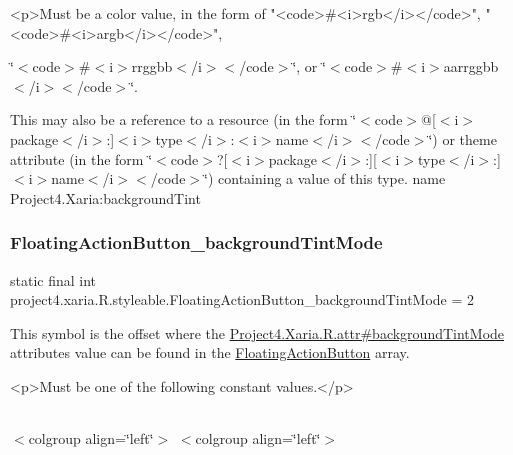 \begin{DoxyVerb}      <p>Must be a color value, in the form of "<code>#<i>rgb</i></code>", "<code>#<i>argb</i></code>",
\end{DoxyVerb}
 \char`\"{}$<$code$>$\#$<$i$>$rrggbb$<$/i$>$$<$/code$>$\char`\"{}, or \char`\"{}$<$code$>$\#$<$i$>$aarrggbb$<$/i$>$$<$/code$>$\char`\"{}. 

This may also be a reference to a resource (in the form \char`\"{}$<$code$>$@\mbox{[}$<$i$>$package$<$/i$>$\+:\mbox{]}$<$i$>$type$<$/i$>$\+:$<$i$>$name$<$/i$>$$<$/code$>$\char`\"{}) or theme attribute (in the form \char`\"{}$<$code$>$?\mbox{[}$<$i$>$package$<$/i$>$\+:\mbox{]}\mbox{[}$<$i$>$type$<$/i$>$\+:\mbox{]}$<$i$>$name$<$/i$>$$<$/code$>$\char`\"{}) containing a value of this type.  name Project4.\+Xaria\+:background\+Tint \mbox{\label{classproject4_1_1xaria_1_1R_1_1styleable_ad842e522e53bfbbcc8e47812cbc7d296}} 
\subsubsection{\texorpdfstring{Floating\+Action\+Button\+\_\+background\+Tint\+Mode}{FloatingActionButton\_backgroundTintMode}}
{\footnotesize\ttfamily static final int project4.\+xaria.\+R.\+styleable.\+Floating\+Action\+Button\+\_\+background\+Tint\+Mode = 2\hspace{0.3cm}{\ttfamily [static]}}

This symbol is the offset where the \hyperlink{}{Project4.\+Xaria.\+R.\+attr\#background\+Tint\+Mode} attribute\textquotesingle{}s value can be found in the \hyperlink{classproject4_1_1xaria_1_1R_1_1styleable_afccbd80ac1ce5fd6f7a9ee0a1b546322}{Floating\+Action\+Button} array.

\begin{DoxyVerb}      <p>Must be one of the following constant values.</p>
\end{DoxyVerb}
 \tabulinesep=1mm
\begin{longtabu} spread 0pt [c]{*{0}{|X[-1]}|}
\hline
\end{longtabu}
$<$colgroup align=\char`\"{}left\char`\"{}$>$ $<$colgroup align=\char`\"{}left\char`\"{}$>$ 

